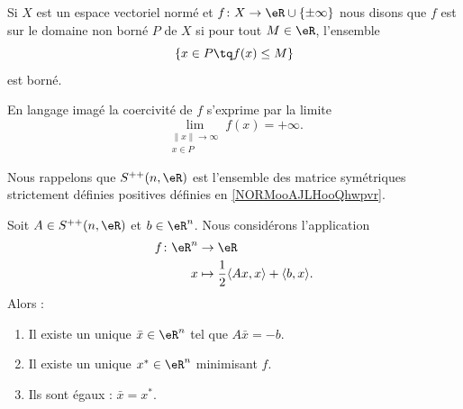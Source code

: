 \begin{definition}  \label{DefQXPooYSygGP}
    Si \( X\) est un espace vectoriel normé et \( f\colon X\to \eR\cup\{ \pm\infty \}\) nous disons que \( f\) est  sur le domaine non borné \( P\) de \( X\) si pour tout \( M\in \eR\), l'ensemble
    \begin{equation}
        \{ x\in P\tq f(x)\leq M \}
    \end{equation}
    est borné.
\end{definition}
En langage imagé la coercivité de \( f\) s'exprime par la limite
\begin{equation}
    \lim_{\substack{\| x \|\to \infty\\x\in P}}f(x)=+\infty.
\end{equation}


Nous rappelons que \( S^{++}(n,\eR)\) est l'ensemble des matrice symétriques strictement définies positives définies en \ref{NORMooAJLHooQhwpvr}.
\begin{proposition}     \label{PROPooYRLDooTwzfWU}
    Soit \( A\in S^{++}(n,\eR)\) et \( b\in \eR^n\). Nous considérons l'application
    \begin{equation}
        \begin{aligned}
            f\colon \eR^n&\to \eR \\
            x&\mapsto \frac{ 1 }{2}\langle Ax, x\rangle +\langle b, x\rangle . 
        \end{aligned}
    \end{equation}
    Alors :
    \begin{enumerate}
        \item
            Il existe un unique \( \bar x\in \eR^n\) tel que \( A\bar x=-b\).
        \item
            Il existe un unique \( x^*\in \eR^n\) minimisant \( f\).
        \item
            Ils sont égaux : \( \bar x=x^*\).
    \end{enumerate}
\end{proposition}

